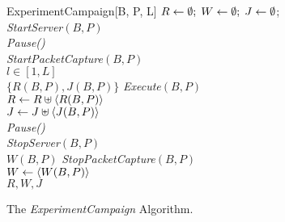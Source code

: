 \documentclass{sig-alternate}
\begin{document}
\begin{figure}


 \begin{center}
      \begin{algorithm}{ExperimentCampaign}[B, P, L]
        { 
        } 
    $R \mathrel{\leftarrow} \emptyset; \; W \mathrel{\leftarrow} \emptyset; \; J \mathrel{\leftarrow} \emptyset$; \label{init}\\	
    \mbox{{\em StartServer}}$(B,P)$ \label{start}\\
    \mbox{{\em Pause()}} \label{pause1} \\
    \mbox{{\em StartPacketCapture}}$(B,P)$ \label{packstart} \\
    \qfor $l \in [1, L]$ \label{for} \\
    \qdo $\{R(B,P), J(B,P)\}$ \qlet \mbox{{\em Execute}}$(B,P)$ \label{exec} \\
    $R \mathrel{\leftarrow} R \uplus \langle R(B,P) \rangle$ \label{storeR} \\
    $J \mathrel{\leftarrow} J \uplus \langle J(B,P) \rangle$ \label{storeJ} \\
    \mbox{{\em Pause()}} \label{pause2} \qrof \\
    \mbox{{\em StopServer}}$(B,P)$ \label{stop} \\  
    $W(B,P)$ \qlet \mbox{{\em StopPacketCapture}}$(B,P)$ \label{packstop} \\
    $W \mathrel{\leftarrow} \langle W(B,P) \rangle$ \label{storeW} \\
    \qreturn $R,W,J$ \label{return}
  \end{algorithm}
  \end{center}
\vspace*{-.15in}
\caption{The {\em ExperimentCampaign} Algorithm.}

\label{fig:experiment-campaign}
\vspace*{-.1in}
\end{figure}
\end{document}
